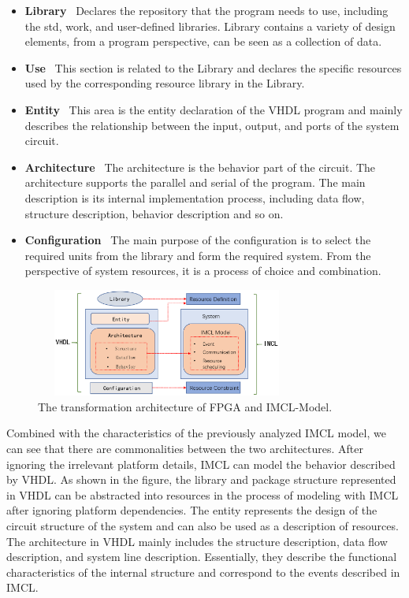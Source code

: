 \begin{itemize}
\item \textbf{Library} \ Declares the repository that the program needs to use, including the std, work, and user-defined libraries. Library contains a variety of design elements, from a program perspective, can be seen as a collection of data.
\item \textbf{Use} \ This section is related to the Library and declares the specific resources used by the corresponding resource library in the Library.
\item \textbf{Entity} \ This area is the entity declaration of the VHDL program and mainly describes the relationship between the input, output, and ports of the system circuit.
\item \textbf{Architecture} \ The architecture is the behavior part of the circuit. The architecture supports the parallel and serial of the program. The main description is its internal implementation process, including data flow, structure description, behavior description and so on.
\item \textbf{Configuration} \ The main purpose of the configuration is to select the required units from the library and form the required system. From the perspective of system resources, it is a process of choice and combination.
\end{itemize}

\begin{figure}[!htb]
  \centering
        \includegraphics[height=1.4in, width=3.4in]{FPGA2IMCL}
  \caption{The transformation architecture of FPGA and IMCL-Model.}\label{FPGA2IMCL}
\end{figure}

Combined with the characteristics of the previously analyzed IMCL model, we can see that there are commonalities between the two architectures. After ignoring the irrelevant platform details, IMCL can model the behavior described by VHDL. As shown in the figure, the library and package structure represented in VHDL can be abstracted into resources in the process of modeling with IMCL after ignoring platform dependencies. The entity represents the design of the circuit structure of the system and can also be used as a description of resources. The architecture in VHDL mainly includes the structure description, data flow description, and system line description. Essentially, they describe the functional characteristics of the internal structure and correspond to the events described in IMCL.


